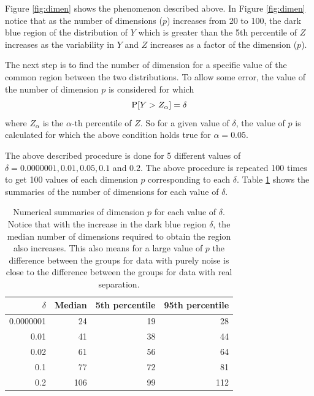  Figure \ref{fig:dimen} shows the phenomenon described above. In Figure \ref{fig:dimen} notice that as the number of dimensions ($p$) increases from 20 to 100, the dark blue region of the distribution of $Y$ which is greater than the 5th percentile of $Z$ increases as the variability in $Y$ and $Z$ increases as a factor of the dimension ($p$).


The next step is to find the number of dimension for a specific value of the common region between the two distributions. To allow some error, the value of the number of dimension $p$ is considered for which $$\hbox{P}[Y > Z_{\alpha}] = \delta$$ where $Z_{\alpha}$ is the $\alpha$-th percentile of $Z$.  So for a given value of $\delta$,  the value of $p$ is calculated for which the above condition holds true for $\alpha = 0.05$.

The above described procedure is done for 5 different values of $\delta  = 0.0000001, 0.01, 0.05, 0.1$ and $0.2$. The above procedure is repeated 100 times to get 100 values of each dimension $p$ corresponding to each $\delta$. Table \ref{tab:dimen} shows the summaries of the number of dimensions for each value of $\delta$.

\begin{table}[htbp]
\begin{center}
\caption{Numerical summaries of dimension $p$ for each value of $\delta$. Notice that with the increase in the dark blue region $\delta$, the median number of dimensions required to obtain the region also increases. This also means for a large value of $p$ the difference between the groups for data with purely noise is close to the difference between the groups for data with real separation. }
\begin{tabular}{rrrr}
  \hline
  \hline
  $\delta$ & Median & 5th percentile & 95th percentile \\
  \hline
  0.0000001 & 24 & 19 & 28 \\
      0.01 & 41 & 38 & 44\\
   0.02 & 61 & 56 & 64 \\
     0.1 & 77 & 72 & 81\\   
     0.2 & 106 & 99 & 112\\ 
      \hline
\end{tabular}
\label{tab:dimen}
\end{center}
\end{table}

